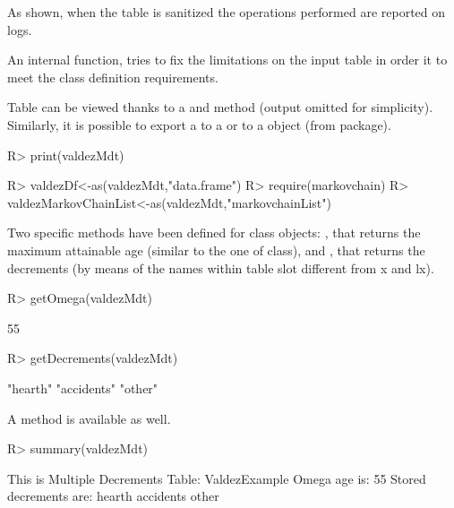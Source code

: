 \documentclass[nojss]{jss}
\begin{document}
As shown, when the table is sanitized the operations performed are reported on
logs.

 An internal function,  tries to fix the limitations on
 the input table in order it to meet the class definition requirements.
 
 Table can be viewed thanks to a  and  method (output omitted for simplicity). Similarly, it is possible to export a  to a  or to a  object (from  package).
 
\begin{Schunk}
\begin{Sinput}
R> print(valdezMdt)
\end{Sinput}
\end{Schunk}

 
\begin{Schunk}
\begin{Sinput}
R> valdezDf<-as(valdezMdt,"data.frame")
R> require(markovchain)
R> valdezMarkovChainList<-as(valdezMdt,"markovchainList")
\end{Sinput}
\end{Schunk}

Two specific methods have been defined for  class objects:
, that returns the maximum attainable age (similar to the one of
 class), and , that returns the decrements (by means of the names within table 
slot different from x and lx).

\begin{Schunk}
\begin{Sinput}
R> getOmega(valdezMdt)
\end{Sinput}
\begin{Soutput}
[1] 55
\end{Soutput}
\begin{Sinput}
R> getDecrements(valdezMdt)
\end{Sinput}
\begin{Soutput}
[1] "hearth"    "accidents" "other"    
\end{Soutput}
\end{Schunk}

A  method is available as well.

\begin{Schunk}
\begin{Sinput}
R> summary(valdezMdt)
\end{Sinput}
\begin{Soutput}
This is Multiple Decrements Table:  ValdezExample 
 Omega age is:  55 
 Stored decrements are:  hearth accidents other
\end{Soutput}
\end{Schunk}
\end{document}
